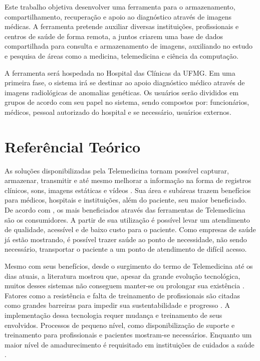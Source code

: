 Este trabalho objetiva desenvolver uma ferramenta para o armazenamento, compartilhamento, recuperação e apoio ao diagnóstico através de imagens médicas.
A ferramenta pretende auxiliar diversas instituições, profissionais e centros de saúde de forma remota, a juntos criarem uma base de dados compartilhada para consulta e armazenamento de imagens, auxiliando no estudo e pesquisa de áreas como a medicina, telemedicina e ciência da computação.

A ferramenta será hospedada no Hospital das Clínicas da UFMG.
Em uma primeira fase, o sistema irá se destinar ao apoio diagnóstico médico através de imagens radiológicas de anomalias genéticas.
Os usuários serão divididos em grupos de acordo com seu papel no sistema, sendo compostos por: funcionários, médicos, pessoal autorizado do hospital e se necessário, usuários externos.

\section{\esp Referêncial Teórico}


As soluções disponibilizadas pela Telemedicina tornam possível capturar, armazenar, transmitir e até mesmo melhorar a informação na forma de registros clínicos, sons, imagens estáticas e vídeos \cite{REF02}.
Sua área e subáreas trazem benefícios para médicos, hospitais e instituições, além do paciente, seu maior beneficiado.
De acordo com \cite{REF04}, os mais beneficiados através das ferramentas de Telemedicina são os consumidores.
A partir de sua utilização é possível levar um atendimento de qualidade, acessível e de baixo custo para o paciente.
Como empresas de saúde já estão mostrando, é possível trazer saúde ao ponto de necessidade, não sendo necessário, transportar o paciente a um ponto de atendimento de difícil acesso.

Mesmo com seus benefícios, desde o surgimento do termo de Telemedicina até os dias atuais, a literatura mostrou que, apesar da grande evolução tecnológica, muitos desses sistemas não conseguem manter-se ou prolongar sua existência \cite{REF16}.
Fatores como a resistência e falta de treinamento de profissionais são citadas como grandes barreiras para impedir sua sustentabilidade e progresso \cite{REF03}.
A implementação dessa tecnologia requer mudança e treinamento de seus envolvidos.
Processos de pequeno nível, como disponibilização de suporte e treinamento para profissionais e pacientes mostram-se necessários.
Enquanto um maior nível de amadurecimento é requisitado em instituições de cuidados a saúde \cite{REF06}.

